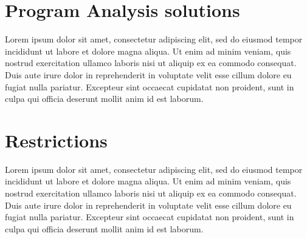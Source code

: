\pagebreak

\section{Program Analysis solutions}

Lorem ipsum dolor sit amet, consectetur adipiscing elit, sed do eiusmod tempor incididunt ut labore et dolore magna aliqua. Ut enim ad minim veniam, quis nostrud exercitation ullamco laboris nisi ut aliquip ex ea commodo consequat. Duis aute irure dolor in reprehenderit in voluptate velit esse cillum dolore eu fugiat nulla pariatur. Excepteur sint occaecat cupidatat non proident, sunt in culpa qui officia deserunt mollit anim id est laborum.


\section{Restrictions}

Lorem ipsum dolor sit amet, consectetur adipiscing elit, sed do eiusmod tempor incididunt ut labore et dolore magna aliqua. Ut enim ad minim veniam, quis nostrud exercitation ullamco laboris nisi ut aliquip ex ea commodo consequat. Duis aute irure dolor in reprehenderit in voluptate velit esse cillum dolore eu fugiat nulla pariatur. Excepteur sint occaecat cupidatat non proident, sunt in culpa qui officia deserunt mollit anim id est laborum.

